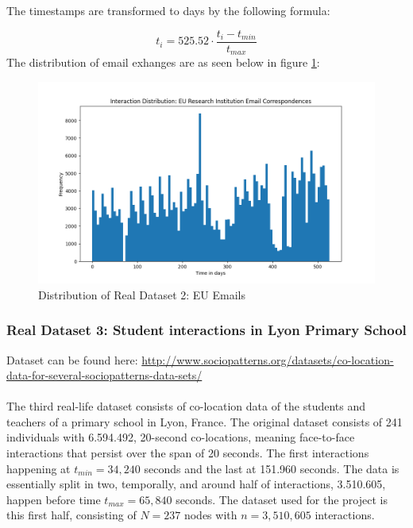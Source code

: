 The timestamps are transformed to days by the following formula:

\begin{equation}
    t_i = 525.52 \cdot \frac{t_i - t_{min}}{t_{max}}
\end{equation}
The distribution of email exhanges are as seen below in figure \ref{fig:RLdataset2}:

\begin{figure}[H]
    \centering
    \includegraphics[width=\textwidth]{0_images/reallife_dataset_2_dist.png}
    \caption{Distribution of Real Dataset 2: EU Emails}
    \label{fig:RLdataset2}
\end{figure}


\subsubsection{Real Dataset 3: Student interactions in Lyon Primary School}
\label{sec:Data:RealData:RealDataset3}
Dataset can be found here: \href{http://www.sociopatterns.org/datasets/co-location-data-for-several-sociopatterns-data-sets/}{http://www.sociopatterns.org/datasets/co-location-data-for-several-sociopatterns-data-sets/}
\\\\
The third real-life dataset consists of co-location data of the students and teachers of a primary school in Lyon, France.
The original dataset consists of 241 individuals with 6.594.492, 20-second co-locations, meaning face-to-face interactions that persist over the span of 20 seconds.
The first interactions happening at $t_{min} = 34,240$ seconds and the last at 151.960 seconds.
The data is essentially split in two, temporally, and around half of interactions, 3.510.605, happen before time $t_{max} = 65,840$ seconds.
The dataset used for the project is this first half, consisting of $N = 237$ nodes with $n = 3,510,605$ interactions.

